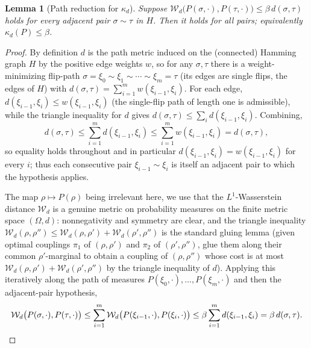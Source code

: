 \documentclass{amsart}
\newtheorem{lemma}{Lemma}
\newcommand{\Om}{\Omega}
\newcommand{\Wd}{\mathcal{W}_d}
\begin{document}
\begin{lemma}[Path reduction for $\kappa_d$]\label{lem:pathreduction}
Suppose $\Wd\big(P(\sigma,\cdot),P(\tau,\cdot)\big)\le\beta\,d(\sigma,\tau)$
holds for every adjacent pair $\sigma\sim\tau$ in $H$. Then it holds for all
pairs; equivalently $\kappa_d(P)\le\beta$.
\end{lemma}
\begin{proof}
By definition $d$ is the path metric induced on the (connected) Hamming graph $H$
by the positive edge weights $w$, so for any $\sigma,\tau$ there is a
weight-minimizing flip-path $\sigma=\xi_0\sim\xi_1\sim\cdots\sim\xi_m=\tau$
(its edges are single flips, the edges of $H$) with
$d(\sigma,\tau)=\sum_{i=1}^m w(\xi_{i-1},\xi_i)$. For each edge,
$d(\xi_{i-1},\xi_i)\le w(\xi_{i-1},\xi_i)$ (the single-flip path of length one is
admissible), while the triangle inequality for $d$ gives
$d(\sigma,\tau)\le\sum_i d(\xi_{i-1},\xi_i)$. Combining,
\[
d(\sigma,\tau)\le\sum_{i=1}^m d(\xi_{i-1},\xi_i)\le\sum_{i=1}^m w(\xi_{i-1},\xi_i)
=d(\sigma,\tau),
\]
so equality holds throughout and in particular $d(\xi_{i-1},\xi_i)=w(\xi_{i-1},\xi_i)$
for every $i$; thus each consecutive pair $\xi_{i-1}\sim\xi_i$ is itself an
adjacent pair to which the hypothesis applies.

The map $\rho\mapsto P(\rho)$ being irrelevant here, we use that the
$L^1$-Wasserstein distance $\Wd$ is a genuine metric on probability measures on
the finite metric space $(\Om,d)$: nonnegativity and symmetry are clear, and the
triangle inequality
$\Wd(\rho,\rho'')\le\Wd(\rho,\rho')+\Wd(\rho',\rho'')$ is the standard gluing
lemma (given optimal couplings $\pi_1$ of $(\rho,\rho')$ and $\pi_2$ of
$(\rho',\rho'')$, glue them along their common $\rho'$-marginal to obtain a
coupling of $(\rho,\rho'')$ whose cost is at most
$\Wd(\rho,\rho')+\Wd(\rho',\rho'')$ by the triangle inequality of $d$). Applying
this iteratively along the path of measures
$P(\xi_0,\cdot),\dots,P(\xi_m,\cdot)$ and then the adjacent-pair hypothesis,
\[
\Wd\big(P(\sigma,\cdot),P(\tau,\cdot)\big)
\le\sum_{i=1}^m \Wd\big(P(\xi_{i-1},\cdot),P(\xi_i,\cdot)\big)
\le\beta\sum_{i=1}^m d(\xi_{i-1},\xi_i)=\beta\,d(\sigma,\tau). \qedhere
\]
\end{proof}
\end{document}

